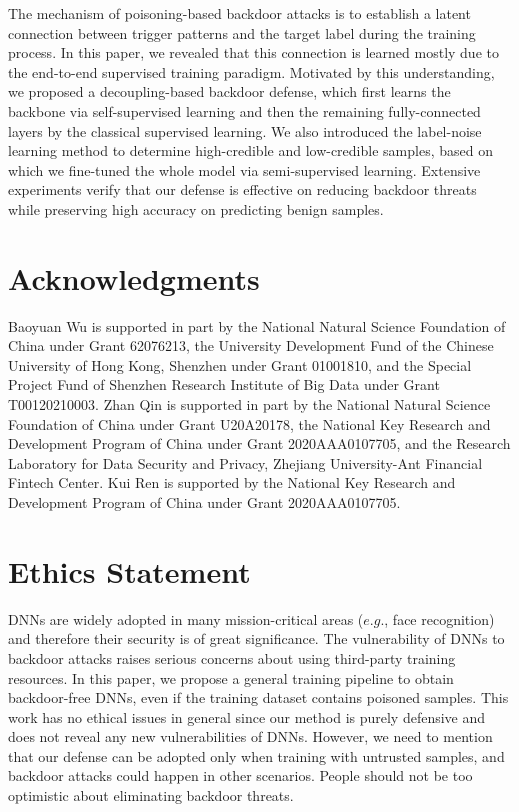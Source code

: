 The mechanism of poisoning-based backdoor attacks is to establish a latent connection between trigger patterns and the target label during the training process. In this paper, we revealed that this connection is learned mostly due to the end-to-end supervised training paradigm. Motivated by this understanding, we proposed a decoupling-based backdoor defense, which first learns the backbone via self-supervised learning and then the remaining fully-connected layers by the classical supervised learning. We also introduced the label-noise learning method to determine high-credible and low-credible samples, based on which we fine-tuned the whole model via semi-supervised learning. Extensive experiments verify that our defense is effective on reducing backdoor threats while preserving high accuracy on predicting benign samples. %

\newpage

\section*{Acknowledgments}
Baoyuan Wu is supported in part by the National Natural Science Foundation of China under Grant 62076213, the University Development Fund of the Chinese University of Hong Kong, Shenzhen under Grant 01001810, and the Special Project Fund of Shenzhen Research Institute of Big Data under Grant T00120210003. 
Zhan Qin is supported in part by the National Natural Science Foundation of China under Grant U20A20178, the National Key Research and Development Program of China under Grant 2020AAA0107705, and the Research Laboratory for Data Security and Privacy, Zhejiang University-Ant Financial Fintech Center.
Kui Ren is supported by the National Key Research and Development Program of China under Grant 2020AAA0107705.

\section*{Ethics Statement}
DNNs are widely adopted in many mission-critical areas ($e.g.$, face recognition) and therefore their security is of great significance. The vulnerability of DNNs to backdoor attacks raises serious concerns about using third-party training resources. In this paper, we propose a general training pipeline to obtain backdoor-free DNNs, even if the training dataset contains poisoned samples. This work has no ethical issues in general since our method is purely defensive and does not reveal any new vulnerabilities of DNNs. However, we need to mention that our defense can be adopted only when training with untrusted samples, and backdoor attacks could happen in other scenarios. People should not be too optimistic about eliminating backdoor threats. 


